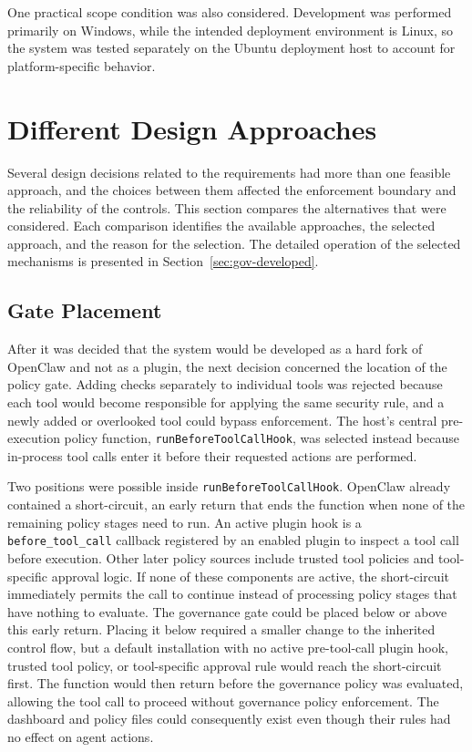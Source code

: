 One practical scope condition was also considered. Development was performed
primarily on Windows, while the intended deployment environment is Linux, so the
system was tested separately on the Ubuntu deployment host to account for
platform-specific behavior.
\section{Different Design Approaches}
\label{sec:gov-approaches}

Several
design decisions related to the requirements had more than one feasible approach, and the choices between
them affected the enforcement boundary and the reliability of the controls. This section compares the alternatives
that were considered. Each comparison identifies the available
approaches, the selected approach, and the reason for the selection. The
detailed operation of the selected mechanisms is presented in
Section~\ref{sec:gov-developed}.

\subsection{Gate Placement}
\label{sec:gov-gate-placement}

After it was decided that the system would be developed as a hard fork of OpenClaw and not as a plugin, the next decision concerned the
location of the policy gate. Adding checks separately to individual tools was
rejected because each tool would become responsible for applying the same
security rule, and a newly added or overlooked tool could bypass enforcement.
The host's central pre-execution policy function, \texttt{runBeforeToolCallHook}, was selected instead because
in-process tool calls enter it before their requested actions are performed.

Two positions were possible inside \texttt{runBeforeToolCallHook}. OpenClaw
already contained a short-circuit, an early return that ends the
function when none of the remaining policy stages need to run. An active plugin
hook is a \texttt{before\_tool\_call} callback registered by an enabled plugin
to inspect a tool call before execution. Other later policy sources include
trusted tool policies and tool-specific approval logic. If none of these
components are active, the short-circuit immediately permits the call to
continue instead of processing policy stages that have nothing to evaluate.
The governance gate could be placed below or above this early return. Placing it
below required a smaller change to the inherited control flow, but a default
installation with no active pre-tool-call plugin hook, trusted tool policy, or
tool-specific approval rule would reach the short-circuit first. The function
would then return before the governance policy was evaluated, allowing the tool
call to proceed without governance policy enforcement. The dashboard and policy files
could consequently exist even though their rules had no effect on agent
actions.

